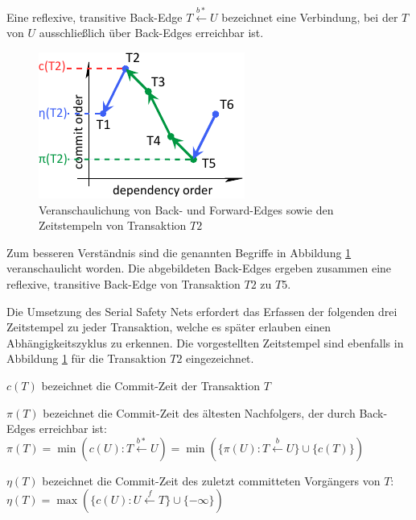\begin{Definition}
	Eine reflexive, transitive \textcolor{my-green}{Back-Edge} $T\xleftarrow{b*} U$ bezeichnet eine Verbindung, bei der $T$ von $U$ ausschließlich über Back-Edges erreichbar ist.
\end{Definition}

\begin{figure}
	\includegraphics{img/Figure_2_1.pdf}
	\caption{Veranschaulichung von \textcolor{my-green}{Back}- und \textcolor{my-blue}{Forward-Edges} sowie den Zeitstempeln von Transaktion $T2$}
	\label{fig:back_forward}
\end{figure}

Zum besseren Verständnis sind die genannten Begriffe in Abbildung \ref{fig:back_forward} veranschaulicht worden.
Die abgebildeten Back-Edges ergeben zusammen eine reflexive, transitive Back-Edge von Transaktion $T2$ zu $T5$.

Die Umsetzung des Serial Safety Nets erfordert das Erfassen der folgenden drei Zeitstempel zu jeder Transaktion, welche es später erlauben einen Abhängigkeitszyklus zu erkennen.
Die vorgestellten Zeitstempel sind ebenfalls in Abbildung \ref{fig:back_forward} für die Transaktion $T2$ eingezeichnet.

\begin{Definition}
	\textcolor{my-red}{$c(T)$} bezeichnet die Commit-Zeit der Transaktion $T$
\end{Definition}

\begin{Definition}
	\textcolor{my-green}{$\pi (T)$} bezeichnet die Commit-Zeit des ältesten Nachfolgers, der durch Back-Edges erreichbar ist:\\		
	$\pi (T)=\min (c(U):T\xleftarrow{b*}U)=\min (\{\pi (U):T\xleftarrow{b}U\}\cup \{c(T)\})$
\end{Definition}

\begin{Definition}
	\textcolor{my-blue}{$\eta (T)$} bezeichnet die Commit-Zeit des zuletzt committeten Vorgängers von $T$:\\
	$\eta (T) = \max (\{c(U):U\xleftarrow{f} T\}\cup \{-\infty \})$
\end{Definition}
